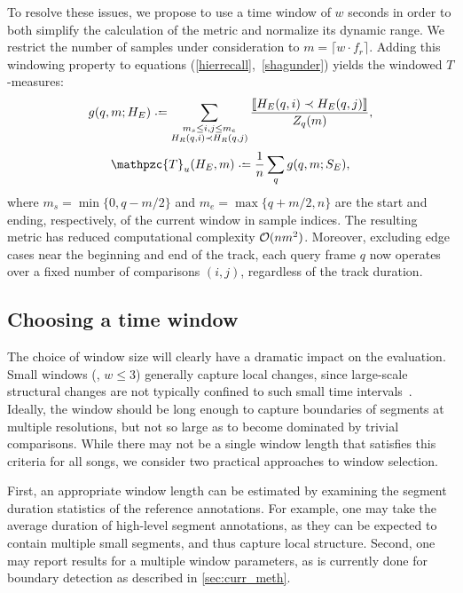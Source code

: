 \documentclass{article}
\def\shag{\ensuremath{\mathpzc{T}}}
\begin{document}
To resolve these issues, we propose to use a time window of $w$ seconds in order to both simplify the 
calculation of the metric and normalize its dynamic range.
We restrict the number of samples under consideration to $m = \lceil w \cdot f_r \rceil$.
Adding this windowing property to equations (\ref{hierrecall},~\ref{shagunder}) yields the windowed $T$-measures:
\begin{equation}
  g(q, m ; H_E) \defeq \sum_{\substack{
  m_s \leq i,j \leq m_e \\ 
  H_R(q, i) \prec H_R(q, j) }} \frac{\ind{H_E(q, i) \prec H_E(q,
  j)}}{Z_q(m)},\label{windowrecall}
\end{equation}
\begin{equation}
\shag_u(H_E, m) \defeq \frac{1}{n} \sum_q g(q,m ; S_E),
\end{equation}
where $m_s = \min\{0,q-m/2\}$ and $m_e = \max\{q+m/2,n\}$ are the start and ending, respectively, of the current window in sample indices.
The resulting metric has reduced computational complexity $\mathcal{O}(nm^2)$.  Moreover, excluding edge cases near the beginning and end of the track, each query frame $q$ now operates over a
fixed number of comparisons $(i, j)$, regardless of the track duration.

\subsection{Choosing a time window}

The choice of window size will clearly have a dramatic impact on the evaluation.
Small windows (\eg, $w \leq 3$) generally capture local changes, since large-scale structural changes are not typically confined to such small time intervals~\cite{Smith2013}.
Ideally, the window should be long enough to capture boundaries of segments at multiple resolutions, but not so large as to become dominated by trivial comparisons.
While there may not be a single window length that satisfies this criteria for all songs, we consider two practical approaches to window selection.

First, an appropriate window length can be estimated by examining the segment duration statistics of the reference annotations.  
For example, one may take the average duration of high-level segment annotations, as they can be expected to contain multiple small segments, and thus capture local structure.
Second, one may report results for a multiple window parameters, as is currently done for boundary detection as described in \cref{sec:curr_meth}.  
\end{document}
